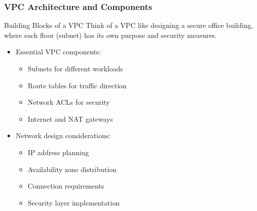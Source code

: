 \documentclass{beamer}
\begin{document}
\begin{frame}
    \frametitle{VPC Architecture and Components}
    
    \begin{block}{Building Blocks of a VPC}
        Think of a VPC like designing a secure office building, where each floor (subnet) has its own purpose and security measures.
    \end{block}
    
    \begin{itemize}
        \item Essential VPC components:
        \begin{itemize}
            \item Subnets for different workloads
            \item Route tables for traffic direction
            \item Network ACLs for security
            \item Internet and NAT gateways
        \end{itemize}
        
        \item Network design considerations:
        \begin{itemize}
            \item IP address planning
            \item Availability zone distribution
            \item Connection requirements
            \item Security layer implementation
        \end{itemize}
    \end{itemize}
\end{frame}
\end{document}
